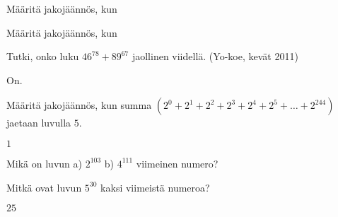 

\begin{kotitehtavasivu}

\begin{tehtava}
	Määritä jakojäännös, kun
  \begin{vastaus}
  \end{vastaus}
\end{tehtava}

\begin{tehtava}
	Määritä jakojäännös, kun
  \begin{vastaus}
  \end{vastaus}
\end{tehtava}

\begin{tehtava}
	Tutki, onko luku $46^{78} + 89^{67}$ jaollinen viidellä. (Yo-koe, kevät 2011)
  \begin{vastaus}
    On.
  \end{vastaus}
\end{tehtava}

\begin{tehtava}
	Määritä jakojäännös, kun summa $(2^0 + 2^1 + 2^2 + 2^3 + 2^4 + 2^5 + \ldots + 2^{244})$ jaetaan luvulla $5$.
  \begin{vastaus}
    $1$
  \end{vastaus}
\end{tehtava}

\begin{tehtava}
	Mikä on luvun a) $2^{103}$  b) $4^{111}$ viimeinen numero?
  \begin{vastaus}
  \end{vastaus}
\end{tehtava}

\begin{tehtava}
	Mitkä ovat luvun $5^{30}$ kaksi viimeistä numeroa?
  \begin{vastaus}
    $25$
  \end{vastaus}
\end{tehtava}


\end{kotitehtavasivu}
